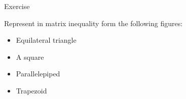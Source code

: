 \documentclass{beamer}
\begin{document}
\begin{frame}{Exercise}
\begin{flushleft}

Represent in matrix inequality form the following figures:

\begin{itemize}
    \item Equilateral triangle
    \item A square
    \item Parallelepiped
    \item Trapezoid
\end{itemize}

\end{flushleft}
\end{frame}





\myqrframe
\end{document}
